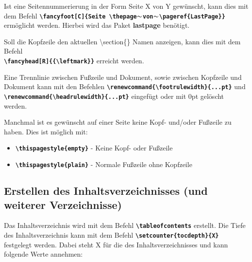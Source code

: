 Ist eine Seitennummerierung in der Form Seite X von Y gewünscht, kann dies mit dem Befehl \textbf{\texttt{\textbackslash fancyfoot[C]\{Seite \textbackslash thepage$\thicksim$von$\thicksim$\textbackslash pageref\{LastPage\}\}}} ermöglicht werden. Hierbei wird das Paket \textbf{lastpage} benötigt.

Soll die Kopfzeile den aktuellen \textbackslash section\{\} Namen anzeigen, kann dies mit dem Befehl \\ \textbf{\texttt{\textbackslash fancyhead[R]\{\{\textbackslash leftmark\}\}}} erreicht werden.

Eine Trennlinie zwischen Fußzeile und Dokument, sowie zwischen Kopfzeile und Dokument kann mit den Befehlen \textbf{\texttt{\textbackslash renewcommand\{\textbackslash footrulewidth\}\{...pt\}}} und \textbf{\texttt{\textbackslash renewcommand\{\textbackslash headrulewidth\}\{...pt\}}} eingefügt oder mit 0pt gelöscht werden.

Manchmal ist es gewünscht auf einer Seite keine Kopf- und/oder Fußzeile zu haben. Dies ist möglich mit:
\begin{itemize}
  \item \textbf{\texttt{\textbackslash thispagestyle\{empty\}}} - Keine Kopf- oder Fußzeile
  \item \textbf{\texttt{\textbackslash thispagestyle\{plain\}}} - Normale Fußzeile ohne Kopfzeile
\end{itemize}

\newpage

\subsection{Erstellen des Inhaltsverzeichnisses (und weiterer Verzeichnisse)}
\label{sec:inhaltsverzeichnis}
Das Inhaltsverzeichnis wird mit dem Befehl \textbf{\texttt{\textbackslash tableofcontents}} erstellt. Die Tiefe des Inhaltsverzeichnis kann mit dem Befehl \textbf{\texttt{\textbackslash setcounter\{tocdepth\}\{X\}}} festgelegt werden. Dabei steht X für die  des Inhaltsverzeichnisses und kann folgende Werte annehmen:

